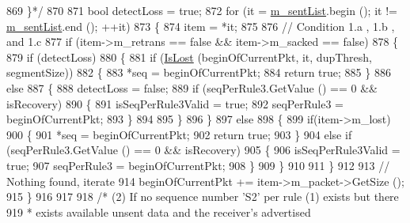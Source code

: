 \begin{DoxyCode}
869 \textcolor{comment}{    \}*/}
870 
871   \textcolor{keywordtype}{bool} detectLoss = \textcolor{keyword}{true};
872   \textcolor{keywordflow}{for} (it = \hyperlink{classns3_1_1TcpTxBuffer_ae131f4743f4537f3606db664874440e5}{m\_sentList}.begin (); it != \hyperlink{classns3_1_1TcpTxBuffer_ae131f4743f4537f3606db664874440e5}{m\_sentList}.end (); ++it)
873     \{
874       item = *it;
875 
876       \textcolor{comment}{// Condition 1.a , 1.b , and 1.c}
877       \textcolor{keywordflow}{if} (item->m\_retrans == \textcolor{keyword}{false} && item->m\_sacked == \textcolor{keyword}{false})
878         \{
879           \textcolor{keywordflow}{if} (detectLoss)
880           \{
881                           \textcolor{keywordflow}{if} (\hyperlink{classns3_1_1TcpTxBuffer_add55043ebbafc30ba4e48d3f8aa9f064}{IsLost} (beginOfCurrentPkt, it, dupThresh, segmentSize))
882                                 \{
883                                   *seq = beginOfCurrentPkt;
884                                   \textcolor{keywordflow}{return} \textcolor{keyword}{true};
885                                 \}
886                           \textcolor{keywordflow}{else}
887                           \{
888                                   detectLoss = \textcolor{keyword}{false};
889                                   \textcolor{keywordflow}{if} (seqPerRule3.GetValue () == 0 && isRecovery)
890                                   \{
891                                         isSeqPerRule3Valid = \textcolor{keyword}{true};
892                                         seqPerRule3 = beginOfCurrentPkt;
893                                   \}
894 
895                           \}
896           \}
897           \textcolor{keywordflow}{else}
898           \{
899                   \textcolor{keywordflow}{if}(item->m\_lost)
900                   \{
901                                   *seq = beginOfCurrentPkt;
902                                   \textcolor{keywordflow}{return} \textcolor{keyword}{true};
903                   \}
904               \textcolor{keywordflow}{else} \textcolor{keywordflow}{if} (seqPerRule3.GetValue () == 0 && isRecovery)
905                 \{
906                   isSeqPerRule3Valid = \textcolor{keyword}{true};
907                   seqPerRule3 = beginOfCurrentPkt;
908                 \}
909           \}
910 
911         \}
912 
913       \textcolor{comment}{// Nothing found, iterate}
914       beginOfCurrentPkt += item->m\_packet->GetSize ();
915     \}
916 
917 
918   \textcolor{comment}{/* (2) If no sequence number 'S2' per rule (1) exists but there}
919 \textcolor{comment}{   *     exists available unsent data and the receiver's advertised}

\end{DoxyCode}
